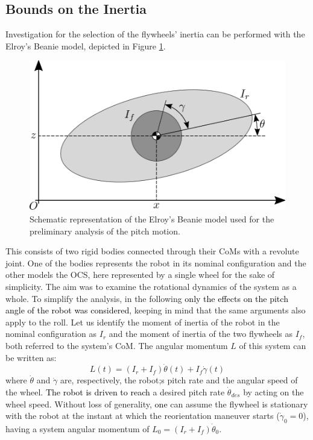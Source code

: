 \documentclass[sensors,article,accept,pdftex,moreauthors]{Definitions/mdpi}
\newcommand{\MF}[1]{\textcolor{black}{#1}}
\begin{document}
\subsection{Bounds on the Inertia}
Investigation for the selection of the flywheels' inertia can be performed with the Elroy's Beanie model, depicted in Figure \ref{fig:elroy-beanie}.
\begin{figure}[H]%
 
	\includegraphics[width=.7\linewidth]{figures/elroys-beanie.eps}
	\caption{\small Schematic representation of the Elroy's Beanie model used for the preliminary analysis of the pitch motion.}
	\label{fig:elroy-beanie}
\end{figure} 
\noindent This consists of two rigid bodies connected through their CoMs with a revolute joint. One of the bodies represents the robot in its nominal configuration and the other models the OCS, here represented by a single wheel for the sake of simplicity. The aim was to examine the rotational dynamics of the system as a whole. To simplify the analysis, in the following \MF{only the effects on the pitch angle of the robot was considered}, keeping in mind that the same arguments also apply to the roll. 
Let us identify the moment of inertia of the robot in the nominal configuration as $I_r$ and the moment of inertia of the two flywheels as $I_f$, both referred to the system's CoM.
The angular momentum $L$ of this system can be written as:
\begin{equation}\label{eq:ang_mom_elroy}
L(t) = \left(I_r + I_{f}\right)\dot{\theta}(t) + I_{f}\dot{\gamma}(t)
\end{equation}
where $\dot{\theta}$ and $\dot{\gamma}$ are, respectively, the robot;s pitch rate and the angular speed of the wheel.
\MF{The robot is driven to reach} a desired pitch rate $\dot{\theta}_{des}$ by acting on the wheel speed.
Without loss of generality, \MF{one} can assume the flywheel is stationary with the robot at the instant at which the reorientation maneuver starts ($\dot{\gamma}_0 = 0$), having a system angular momentum of $L_0 = \left(I_r + I_{f}\right)\dot{\theta}_0$.
\end{document}
